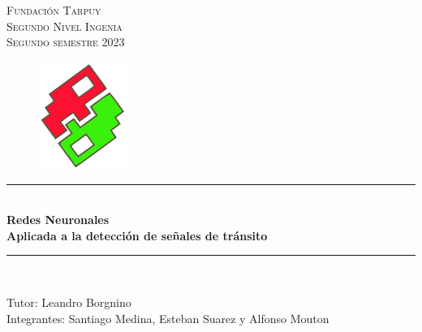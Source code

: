 \documentclass[13pt, letterpaper, oneside]{article}
\begin{document}

	\begin{titlepage}
	\newcommand{\HRule}{\rule{\linewidth}{0.5mm}}
	\center %
	\vspace*{4cm}
	\textsc{\Huge Fundación Tarpuy}\\[0.3cm]
	\textsc{\Large Segundo Nivel Ingenia}\\[0.2cm]
	\textsc{Segundo semestre 2023}\\[0.3cm]
	\begin{figure}[ht]
		\centering
		\includegraphics[height=3.5cm]{2}
	\end{figure}

	\HRule \\[0.8cm]
	{ \huge \bfseries Redes Neuronales}\\[0.4cm] %
	{ \large \bfseries Aplicada a la detección de señales de tránsito}\\[0.2cm]
	\HRule \\[1.0cm]
 

	\begin{minipage}{0.8\textwidth}
		\begin{center} \large
			Tutor: Leandro Borgnino \\[0.5cm]
			Integrantes: Santiago Medina, Esteban Suarez y Alfonso Mouton
		\end{center}
	\end{minipage}

	\vspace{1cm}
	\end{titlepage}
\end{document}
